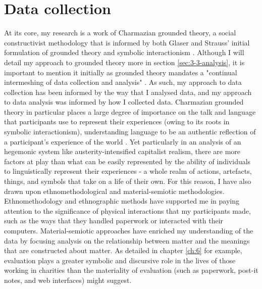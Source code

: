 \section{Data collection}
\label{sec:3-2-collection}
At its core, my research is a work of Charmazian grounded theory, a social constructivist methodology that is informed by both Glaser and Strauss' initial formulation of grounded theory and symbolic interactionism \citep{charmaz_constructing_2006}. Although I will detail my approach to grounded theory more in section \ref{sec:3-3-analysis}, it is important to mention it initially as grounded theory mandates a "continual intermeshing of data collection and analysis" \citep{glaser_discovery_2009}. As such, my approach to data collection has been informed by the way that I analysed data, and my approach to data analysis was informed by how I collected data. Charmazian grounded theory in particular places a large degree of importance on the talk and language that participants use to represent their experiences (owing to its roots in symbolic interactionism), understanding language to be an authentic reflection of a participant's experience of the world \citep{charmaz_constructing_2006, mead_mind_2015}. Yet particularly in an analysis of an hegemonic system like austerity-intensified capitalist realism, there are more factors at play than what can be easily represented by the ability of individuals to linguistically represent their experiences - a whole realm of actions, artefacts, things, and symbols that take on a life of their own. For this reason, I have also drawn upon ethnomethodological and material-semiotic methodologies. Ethnomethodology and ethnographic methods have supported me in paying attention to the significance of physical interactions that my participants made, such as the ways that they handled paperwork or interacted with their computers. Material-semiotic approaches have enriched my understanding of the data by focusing analysis on the relationship between matter and the meanings that are constructed about matter. As detailed in chapter \ref{ch:6} for example, evaluation plays a greater symbolic and discursive role in the lives of those working in charities than the materiality of evaluation (such as paperwork, post-it notes, and web interfaces) might suggest. 

